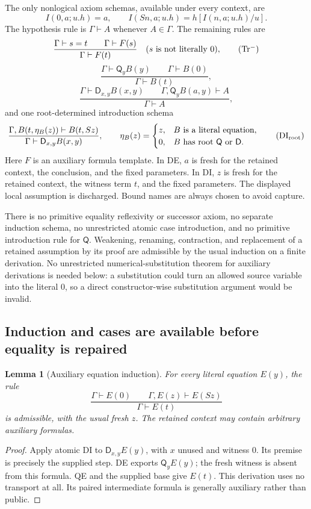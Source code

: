 \documentclass[11pt,letterpaper]{article}
\newtheorem{lemma}[theorem]{Lemma}
\theoremstyle{definition}
\newcommand{\D}{\mathsf D}
\newcommand{\Q}{\mathsf Q}
\begin{document}
The only nonlogical axiom schemas, available under every context, are
\[
 I(0,a;u.h)=a,\qquad
 I(Sn,a;u.h)=h[I(n,a;u.h)/u].
 \tag{I0,IS}
\]
The hypothesis rule is $\Gamma\vdash A$ whenever $A\in\Gamma$.
The remaining rules are
\[
 \frac{\Gamma\vdash s=t\qquad\Gamma\vdash F(s)}
      {\Gamma\vdash F(t)}
 \quad(s\text{ is not literally }0),
 \tag{Tr$^{-}$}\label{eq:restricted-tr}
\]
\[
 \frac{\Gamma\vdash\Q_y B(y)\qquad\Gamma\vdash B(0)}
      {\Gamma\vdash B(t)},
 \tag{QE}
\]
\[
 \frac{\Gamma\vdash\D_{x,y}B(x,y)\qquad
       \Gamma,\Q_yB(a,y)\vdash A}
      {\Gamma\vdash A},
 \tag{DE}
\]
and one root-determined introduction schema
\begin{equation}
 \frac{\Gamma,B(t,\eta_B(z))\vdash B(t,Sz)}
      {\Gamma\vdash\D_{x,y}B(x,y)},\qquad
 \eta_B(z)=
 \begin{cases}
 z,&B\text{ is a literal equation},\\
 0,&B\text{ has root }\Q\text{ or }\D.
 \end{cases}
 \tag{DI$_{\rm root}$}\label{eq:root-di}
\end{equation}
Here $F$ is an auxiliary formula template.  In DE, $a$ is fresh for the
retained context, the conclusion, and the fixed parameters.  In DI,
$z$ is fresh for the retained context, the witness term $t$, and the
fixed parameters.  The displayed local assumption is discharged.
Bound names are always chosen to avoid capture.

There is no primitive equality reflexivity or successor axiom, no
separate induction schema, no unrestricted atomic case introduction,
and no primitive introduction rule for $\Q$.  Weakening, renaming,
contraction, and replacement of a retained assumption by its proof are
admissible by the usual induction on a finite derivation.  No unrestricted
numerical-substitution theorem for auxiliary derivations is needed below:
a substitution could turn an allowed source variable into the literal
$0$, so a direct constructor-wise substitution argument would be invalid.

\subsection{Induction and cases are available before equality is repaired}

\begin{lemma}[Auxiliary equation induction]\label{lem:aux-ei}
For every literal equation $E(y)$, the rule
\[
 \frac{\Gamma\vdash E(0)\qquad
       \Gamma,E(z)\vdash E(Sz)}
      {\Gamma\vdash E(t)}
\]
is admissible, with the usual fresh $z$.  The retained context may contain
arbitrary auxiliary formulas.
\end{lemma}
\begin{proof}
Apply atomic DI to $\D_{x,y}E(y)$, with $x$ unused and witness $0$.
Its premise is precisely the supplied step.  DE exports $\Q_yE(y)$;
the fresh witness is absent from this formula.  QE and the supplied base
give $E(t)$.  This derivation uses no transport at all.  Its paired
intermediate formula is generally auxiliary rather than public.
\end{proof}
\end{document}
